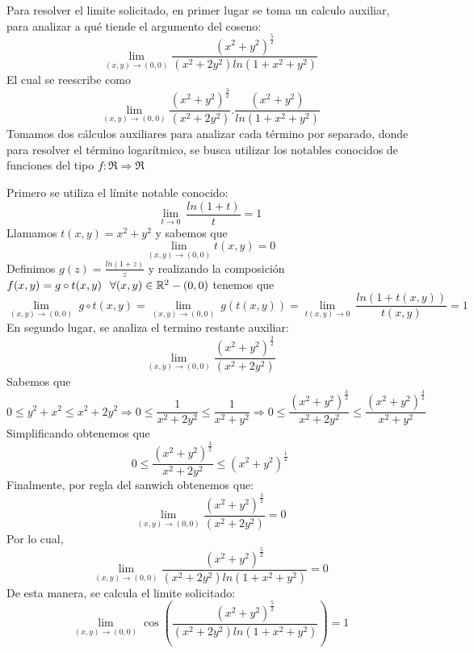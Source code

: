 \begin{solution}
Para resolver el limite solicitado, en primer lugar se toma un calculo auxiliar, para analizar a qué tiende el argumento del coseno:
\[
        \lim_{(x,y)\to(0,0)} \frac{(x^2 + y^2)^{\frac{5}{2}}}{(x^2+2y^2)ln(1+x^2+y^2)} 
    \]
El cual se reescribe como
\[
        \lim_{(x,y)\to(0,0)} \frac{(x^2 + y^2)^{\frac{3}{2}}}{(x^2+2y^2)} .\frac{(x^2 + y^2)}{ln(1+x^2+y^2)} 
    \]
    Tomamos dos cálculos auxiliares para analizar cada término por separado, donde para resolver el término logarítmico, se busca utilizar los notables conocidos de funciones del tipo $f:\Re\Rightarrow\Re$

Primero se utiliza el límite notable conocido:    
\[
        \lim_{t\to 0} \
        \frac{ln(1+t)}{t}=1
    \]
    Llamamos  $t(x,y)=x^{2}+y^{2}$ y sabemos que 
   \[
        \lim_{(x,y)\to(0,0)} t(x,y)=0
    \]
    Definimos $g(z)=\frac{ln(1+z)}{z} $ y realizando la composición $f(x,y)=g\circ t(x,y) \hspace{0.25cm}\forall (x,y)\in \mathbb{R}^ 2 -(0,0)$ tenemos que
\[
        \lim_{(x,y)\to (0,0)} \
        g\circ t(x,y)=\lim_{(x,y)\to (0,0)} \
        g(t(x,y))=\lim_{t(x,y)\to 0} \
        \frac{ln(1+t(x,y))}{t(x,y)}=1
    \]
En segundo lugar, se analiza el termino restante 
auxiliar:
\[
        \lim_{(x,y)\to(0,0)} \frac{(x^2 + y^2)^{\frac{3}{2}}}{(x^2+2y^2)} 
    \]
Sabemos que
 \[
        0\le y^2+x^2\le x^2+2y^2    \Rightarrow   0\le \frac{1}{x^2+2y^2}\le \frac{1}{x^2+y^2} \Rightarrow   0\le \frac{(x^2 + y^2)^{\frac{3}{2}}}{x^2+2y^2}\le \frac{(x^2 + y^2)^{\frac{3}{2}}}{x^2+y^2}
    \]
Simplificando obtenemos que
 \[
         0\le \frac{(x^2 + y^2)^{\frac{3}{2}}}{x^2+2y^2}\le (x^2 + y^2)^{\frac{1}{2}}
    \]
Finalmente, por regla del sanwich obtenemos que:
\[
        \lim_{(x,y)\to(0,0)} \frac{(x^2 + y^2)^{\frac{3}{2}}}{(x^2+2y^2)}=0 
    \]
Por lo cual, 
\[
        \lim_{(x,y)\to(0,0)} \frac{(x^2 + y^2)^{\frac{5}{2}}}{(x^2+2y^2)ln(1+x^2+y^2)} =0
    \]
De esta manera, se calcula el limite solicitado:
    \[
        \lim_{(x,y)\to(0,0)} \cos\left({\frac{(x^2 + y^2)^{\frac{5}{2}}}{(x^2+2y^2)ln(1+x^2+y^2)}} \right)=1
    \]

\end{solution}
\newpage


